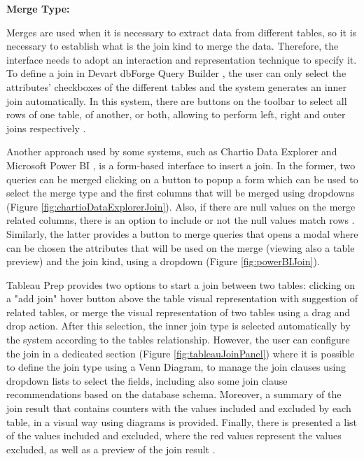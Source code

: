   \bigskip

\textbf{Merge Type:}



Merges are used when it is necessary to extract data from different tables, so it is necessary to establish what is the join kind to merge the data. Therefore, the interface needs to adopt an interaction and representation technique to specify it. To define a join in Devart dbForge Query Builder \cite{dbForgeQueryBuilder}, the user can only select the attributes’ checkboxes of the different tables and the system generates an inner join automatically. In this system, there are buttons on the toolbar to select all rows of one table, of another, or both, allowing to perform left, right and outer joins respectively \cite{dbForgeMakingJoinsBetweenTables}.
  
Another approach used by some systems, such as Chartio Data Explorer \cite{chartioDataExplorer} and Microsoft Power BI \cite{powerBI}, is a form-based interface to insert a join. In the former, two queries can be merged clicking on a button to popup a form which can be used to select the merge type and the first columns that will be merged using dropdowns \cite{chartioDataExplorer} (Figure \ref{fig:chartioDataExplorerJoin}). Also, if there are null values on the merge related columns, there is an option to include or not the null values match rows \cite{chartioJoiningDataAcrossDatabases}. Similarly, the latter provides a button to merge queries that opens a modal where can be chosen the attributes that will be used on the merge (viewing also a table preview) and the join kind, using a dropdown \cite{powerBIShapeAndCombineData} (Figure \ref{fig:powerBIJoin}).
  
Tableau Prep \cite{tableauPrep} provides two options to start a join between two tables: clicking on a "add join" hover button above the table visual representation with suggestion of related tables, or merge the visual representation of two tables using a drag and drop action. After this selection, the inner join type is selected automatically by the system according to the tables relationship. \cite{tableauAggregateJoinOrUnionData} \cite{tableauAddMoreDataInTheInputStep} However, the user can configure the join in a dedicated section (Figure \ref{fig:tableauJoinPanel}) where it is possible to define the join type using a Venn Diagram, to manage the join clauses using dropdown lists to select the fields, including also some join clause recommendations based on the database schema. Moreover, a summary of the join result that contains counters with the values included and excluded by each table, in a visual way using diagrams is provided. Finally, there is presented a list of the values included and excluded, where the red values represent the values excluded, as well as a preview of the join result \cite{tableauAggregateJoinOrUnionData}.

